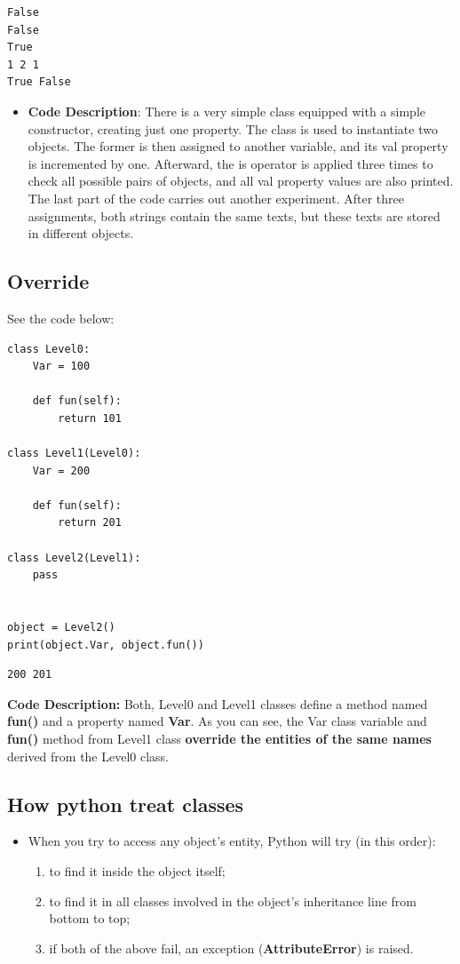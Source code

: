 \documentclass[11pt]{article}
\begin{document}
\begin{verbatim}
False
False
True
1 2 1
True False
\end{verbatim}

\begin{itemize}
\item \textbf{Code Description}: There is a very simple class equipped with a
simple constructor, creating just one property. The class is used to
instantiate two objects. The former is then assigned to another
variable, and its val property is incremented by one.  Afterward,
the is operator is applied three times to check all possible pairs
of objects, and all val property values are also printed. The last
part of the code carries out another experiment. After three
assignments, both strings contain the same texts, but these texts
are stored in different objects.
\end{itemize}
\subsection{Override}
\label{sec:orga637e4f}

See the code below:

\begin{verbatim}
class Level0:
	Var = 100

	def fun(self):
		return 101

class Level1(Level0):
	Var = 200

	def fun(self):
		return 201

class Level2(Level1):
	pass


object = Level2()
print(object.Var, object.fun())

\end{verbatim}

\begin{verbatim}
200 201
\end{verbatim}

\textbf{Code Description:} Both, Level0 and Level1 classes define a method
 named \textbf{fun()} and a property named \textbf{Var}. As you can see, the Var
 class variable and \textbf{fun()} method from Level1 class \textbf{override the
 entities of the same names} derived from the Level0 class.

\subsection{How python treat classes}
\label{sec:org6085519}
\begin{itemize}
\item When you try to access any object’s entity, Python will try (in this
order):

\begin{enumerate}
\item to find it inside the object itself;
\item to find it in all classes involved in the object’s inheritance
line from bottom to top;
\item if both of the above fail, an exception (\textbf{AttributeError}) is
raised.
\end{enumerate}
\end{itemize}
\end{document}
